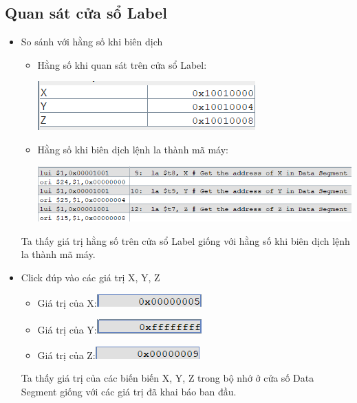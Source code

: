 \documentclass[12pt,a4paper,oneside]{article}
\begin{document}
	\subsection{Quan sát cửa sổ Label}
	\begin{itemize}
	\item So sánh với hằng số khi biên dịch
		\begin{itemize}
	\item Hằng số khi quan sát trên cửa sổ Label: \begin{center}
	 \includegraphics[scale=0.8]{image/19}
	\end{center}
	\item Hằng số khi biên dịch lệnh la thành mã máy: \begin{center}
	\includegraphics[scale=0.8]{image/20}
	\end{center}
	\end{itemize}
	Ta thấy giá trị hằng số trên cửa sổ Label giống với hằng số khi biên dịch lệnh la thành mã máy.
	\item Click đúp vào các giá trị X, Y, Z
	\begin{itemize}
	\item Giá trị của X:\quad\quad \includegraphics[scale=0.8]{image/21}
	\item Giá trị của Y:\quad\quad \includegraphics[scale=0.8]{image/22}
	\item Giá trị của Z:\quad\quad \includegraphics[scale=0.8]{image/23}
	\end{itemize}
	Ta thấy giá trị của các biến biến X, Y, Z trong bộ nhớ ở cửa số Data Segment giống với các giá trị đã khai báo ban đầu.
	\end{itemize}
\end{document}
